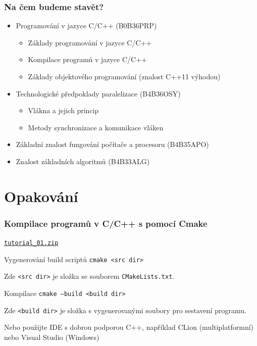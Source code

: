 \documentclass[usenames,dvipsnames,9pt]{beamer}
\newcommand{\download}[1]{\hfill\faDownload\hspace{5pt}\href{https://cw.fel.cvut.cz/wiki/_media/courses/b4b36pdv/tutorials/#1}{\tt #1}}
\begin{document}
\begin{frame}
  \frametitle{Na čem budeme stavět?}
  \begin{itemize}
    \item Programování v jazyce C/C++ {\small (B0B36PRP)}
          \begin{itemize}
            \item Základy programování v jazyce C/C++
            \item Kompilace programů v jazyce C/C++
            \item Základy objektového programování (znalost C++11 výhodou)
          \end{itemize}
    \pause
    \item Technologické předpoklady paralelizace {\small (B4B36OSY)}
          \begin{itemize}
            \item Vlákna a jejich princip
            \item Metody synchronizace a komunikace vláken
          \end{itemize}
    \pause
    \item Základní znalost fungování počítače a procesoru {\small (B4B35APO)}
    \pause
    \item Znalost základních algoritmů {\small (B4B33ALG)}
  \end{itemize}
\end{frame}

\section{Opakování}
\begin{frame}
  \frametitle{Kompilace programů v C/C++ s pomocí Cmake}
  \download{tutorial\_01.zip} \\[1.3em]
  \begin{block}{Vygenerování build scriptů}
    \texttt{cmake <src dir>}
  \end{block}
  Zde \texttt{<src dir>} je složka se souborem \texttt{CMakeLists.txt}.
  \vspace{1em}
  \begin{block}{Kompilace}
    \texttt{cmake --build <build dir>}
  \end{block}
  Zde \texttt{<build dir>} je složka s vygenerovanými soubory pro sestavení programu.

  Nebo použijte IDE s dobrou podporou C++, například CLion (multiplatformní) nebo Visual Studio (Windows)
\end{frame}
\end{document}
